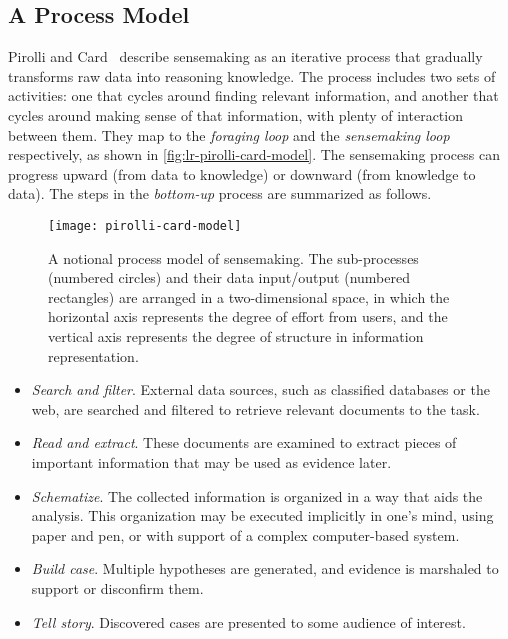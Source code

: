 \subsection{A Process Model}
\label{sub:lr-pcm}
Pirolli and Card~\cite{Pirolli2005} describe sensemaking as an iterative process that gradually transforms raw data into reasoning knowledge. The process includes two sets of activities: one that cycles around finding relevant information, and another that cycles around making sense of that information, with plenty of interaction between them. They map to the \emph{foraging loop} and the \emph{sensemaking loop} respectively, as shown in \autoref{fig:lr-pirolli-card-model}. The sensemaking process can progress upward (from data to knowledge) or downward (from knowledge to data). The steps in the \emph{bottom-up} process are summarized as follows.

\begin{figure}
	\centering
	\texttt{[image: pirolli-card-model]}
	\caption[The Pirolli and Card's model of sensemaking]{A notional process model of sensemaking. The sub-processes (numbered circles) and their data input/output (numbered rectangles) are arranged in a two-dimensional space, in which the horizontal axis represents the degree of effort from users, and the vertical axis represents the degree of structure in information representation. }
	\label{fig:lr-pirolli-card-model}
\end{figure}

\begin{itemize}
	\item \emph{Search and filter}. External data sources, such as classified databases or the web, are searched and filtered to retrieve relevant documents to the task.
	\item \emph{Read and extract}. These documents are examined to extract pieces of important information that may be used as evidence later.
	\item \emph{Schematize}.  The collected information is organized in a way that aids the analysis. This organization may be executed implicitly in one's mind, using paper and pen, or with support of a complex computer-based system.
	\item \emph{Build case}. Multiple hypotheses are generated, and evidence is marshaled to support or disconfirm them.
	\item \emph{Tell story}. Discovered cases are presented to some audience of interest.
\end{itemize}

